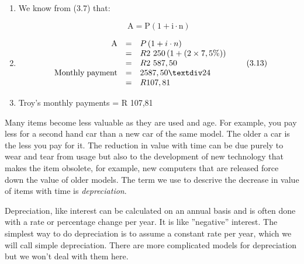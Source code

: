 {\begin{mdframed}[linewidth=4, leftmargin=40, rightmargin=40]
\begin{exercise}
\begin{enumerate}[noitemsep, label=\textbf{Step} \textbf{\arabic*}. ]
        \label{m39332*id71089}
We are required to find the closing balance (A) and then the monthly payments.\par 
        \item  
        \label{m39332*id71099}We know from (3.7) that:\par 
        \label{m39332*id71107}\nopagebreak\noindent{}
    \begin{equation}
    \mathrm{A}=\mathrm{P}\left(1+\mathrm{i}\ensuremath{\cdot}\mathrm{n}\right)\tag{3.12}
      \end{equation}
        \item  
        \label{m39332*id71164}\nopagebreak\noindent{}
    \begin{equation}
    \begin{array}{ccc}\hfill \mathrm{A}& =& P\left(1+i\ensuremath{\cdot}n\right)\hfill \\ & =& R2\phantom{\rule{3.33333pt}{0ex}}250\left(1+\left(2\ensuremath{\times}7,5\%\right)\right)\hfill \\ & =& R2\phantom{\rule{3.33333pt}{0ex}}587,50\hfill \\ \hfill \mathrm{Monthly\; payment}& =& 2587,50÷24\hfill \\ & =& R107,81\hfill \end{array}\tag{3.13}
      \end{equation}
        \item  
        \label{m39332*id71325}Troy's monthly payments = R 107,81
 \par 
        \end{enumerate}
    \end{exercise}
    \end{mdframed}
    }
    \noindent
        \label{m39332*id71341}Many items become less valuable as they are used and age. For example, you pay less for a second hand car than a new car of the same model. The older a car is the less you pay for it. The reduction in value with time can be due purely to wear and tear from usage but also to the development of new technology that makes the item obsolete, for example, new computers that are released force down the value of older models. The term we use to descrive the decrease in value of items with time is \textsl{depreciation}.\par 
        \label{m39332*id71354}Depreciation, like interest can be calculated on an annual basis and is often done with a rate or percentage change per year. It is like ''negative'' interest. The simplest way to do depreciation is to assume a constant rate per year, which we will call simple depreciation. There are more complicated models for depreciation but we won't deal with them here.\par 
